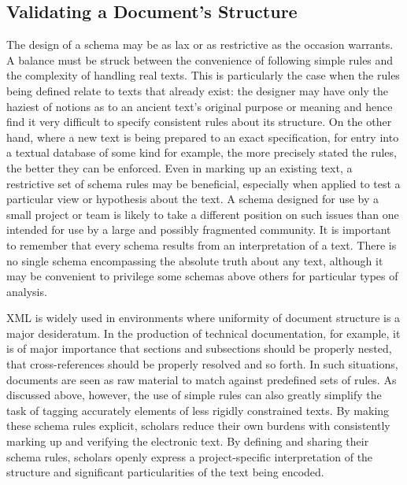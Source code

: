 \subsection[{Validating a Document's Structure}]{Validating a Document's Structure}\label{SG14}\par
The design of a schema may be as lax or as restrictive as the occasion warrants. A balance must be struck between the convenience of following simple rules and the complexity of handling real texts. This is particularly the case when the rules being defined relate to texts that already exist: the designer may have only the haziest of notions as to an ancient text's original purpose or meaning and hence find it very difficult to specify consistent rules about its structure. On the other hand, where a new text is being prepared to an exact specification, for entry into a textual database of some kind for example, the more precisely stated the rules, the better they can be enforced. Even in marking up an existing text, a restrictive set of schema rules may be beneficial, especially when applied to test a particular view or hypothesis about the text. A schema designed for use by a small project or team is likely to take a different position on such issues than one intended for use by a large and possibly fragmented community. It is important to remember that every schema results from an interpretation of a text. There is no single schema encompassing the absolute truth about any text, although it may be convenient to privilege some schemas above others for particular types of analysis.\par
XML is widely used in environments where uniformity of document structure is a major desideratum. In the production of technical documentation, for example, it is of major importance that sections and subsections should be properly nested, that cross-references should be properly resolved and so forth. In such situations, documents are seen as raw material to match against predefined sets of rules. As discussed above, however, the use of simple rules can also greatly simplify the task of tagging accurately elements of less rigidly constrained texts. By making these schema rules explicit, scholars reduce their own burdens with consistently marking up and verifying the electronic text. By defining and sharing their schema rules, scholars openly express a project-specific interpretation of the structure and significant particularities of the text being encoded.\par
